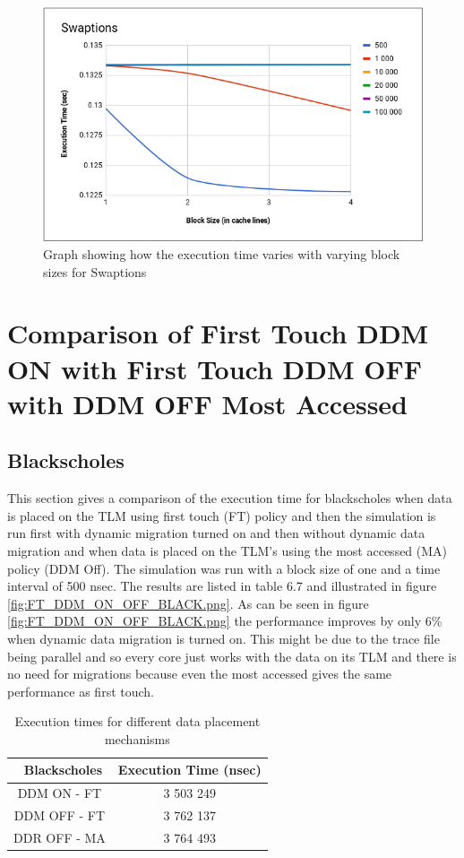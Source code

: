 \documentclass{listhesis}
\begin{document}
\begin{figure}
  \includegraphics[width=\linewidth]{Swap_var_bs_fordiff_t.png}
  \centering
  \caption{Graph showing how the execution time varies with varying block sizes for Swaptions}
  \label{fig:Swap_var_bs_fordiff_t.png}
\end{figure}


\section{Comparison of First Touch DDM ON with First Touch DDM OFF with DDM OFF Most Accessed}
\subsection{Blackscholes}
This section gives a comparison of the execution time for blackscholes when data is placed on the TLM using first touch (FT) policy and then the simulation is run first with dynamic migration turned on and then without dynamic data migration and when data is placed on the TLM's using the most accessed (MA) policy (DDM Off). The simulation was run with a block size of one and a time interval of 500 nsec. The results are listed in table 6.7 and illustrated in figure \ref{fig:FT_DDM_ON_OFF_BLACK.png}. As can be seen in figure \ref{fig:FT_DDM_ON_OFF_BLACK.png} the performance improves by only 6\% when dynamic data migration is turned on. This might be due to the trace file being parallel and so every core just works with the data on its TLM and there is no need for migrations because even the most accessed gives the same performance as first touch.\\

\begin{table}[h!]
\begin{center}
 \begin{tabular}{|| c | c ||} 
 \hline
 \ \textbf{Blackscholes}  & \textbf{Execution Time (nsec)}\\ [0.5 ex] 
 \hline\hline
   DDM ON - FT & 3 503 249 \\ 
 \hline
   DDM OFF - FT & 3 762 137 \\
 \hline
   DDR OFF - MA & 3 764 493 \\
 \hline
\end{tabular}
 \caption{Execution times for different data placement mechanisms}
 \label{table:ExecTimes4}
\end{center}
\end{table}
\end{document}
